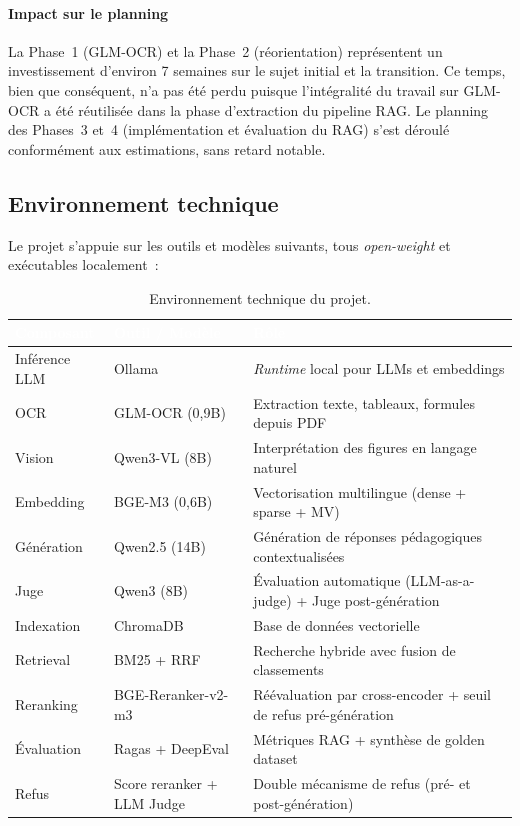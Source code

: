 \documentclass[11pt,a4paper]{article}
\begin{document}
\paragraph{Impact sur le planning}

La Phase~1 (GLM-OCR) et la Phase~2 (réorientation) représentent un investissement d'environ 7 semaines sur le sujet initial et la transition. Ce temps, bien que conséquent, n'a pas été perdu puisque l'intégralité du travail sur GLM-OCR a été réutilisée dans la phase d'extraction du pipeline RAG. Le planning des Phases~3 et~4 (implémentation et évaluation du RAG) s'est déroulé conformément aux estimations, sans retard notable.

\subsection{Environnement technique}

Le projet s'appuie sur les outils et modèles suivants, tous \textit{open-weight} et exécutables localement~:

\begin{table}[H]
\centering
\begin{tabularx}{\linewidth}{L{3cm} L{4cm} L{5.5cm}}
\toprule
{}
\textcolor{white}{\textbf{Composant}} & \textcolor{white}{\textbf{Outil / Modèle}} & \textcolor{white}{\textbf{Rôle}} \\
\midrule
Inférence LLM   & Ollama                  & \textit{Runtime} local pour LLMs et embeddings \\
OCR             & GLM-OCR (0,9B)          & Extraction texte, tableaux, formules depuis PDF \\
Vision          & Qwen3-VL (8B)           & Interprétation des figures en langage naturel \\
Embedding       & BGE-M3 (0,6B)           & Vectorisation multilingue (dense + sparse + MV) \\
Génération      & Qwen2.5 (14B)           & Génération de réponses pédagogiques contextualisées \\
Juge            & Qwen3 (8B)              & Évaluation automatique (LLM-as-a-judge) + Juge post-génération \\
Indexation      & ChromaDB                & Base de données vectorielle \\
Retrieval       & BM25 + RRF              & Recherche hybride avec fusion de classements \\
Reranking       & BGE-Reranker-v2-m3     & Réévaluation par cross-encoder + seuil de refus pré-génération \\
Évaluation      & Ragas + DeepEval        & Métriques RAG + synthèse de golden dataset \\
Refus           & Score reranker + LLM Judge & Double mécanisme de refus (pré- et post-génération) \\
\bottomrule
\end{tabularx}
\caption{Environnement technique du projet.}
\label{tab:env-tech}
\end{table}
\end{document}
